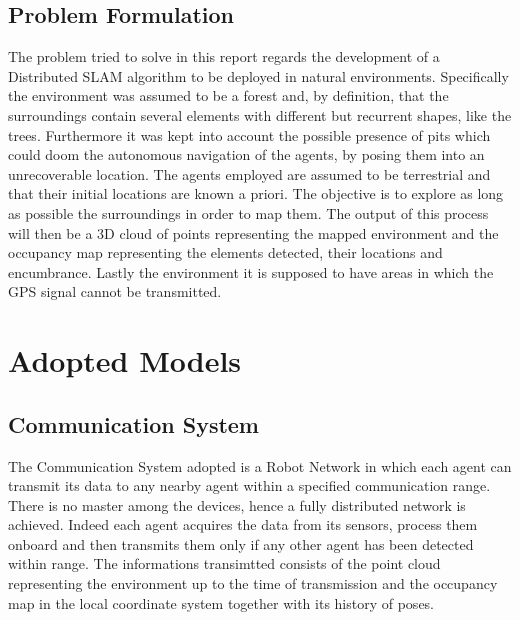 \documentclass[twocolumn, a4paper]{article}
\begin{document}
\subsection{Problem Formulation}
The problem tried to solve in this report regards the development
of a Distributed SLAM algorithm to be deployed in natural environments.
Specifically the environment was assumed to be a forest and, by definition,
that the surroundings contain several elements with different but recurrent
shapes, like the trees. Furthermore it was kept into account the possible
presence of pits which could doom the autonomous navigation of the agents,
by posing them into an unrecoverable location. The agents employed are
assumed to be terrestrial and that their initial locations are known a
priori. The objective is to explore as long as possible the surroundings
in order to map them. The output of this process will then be a 3D cloud of
points representing the mapped environment and the occupancy map representing
the elements detected, their locations and encumbrance.
Lastly the environment it is supposed to have areas in which the GPS signal
cannot be transmitted.

\section{Adopted Models}
\subsection{Communication System}
The Communication System adopted is a Robot Network in which each agent can
transmit its data to any nearby agent within a specified communication range.
There is no master among the devices, hence a fully distributed network is
achieved. Indeed each agent acquires the data from its sensors, process them
onboard and then transmits them only if any other agent has been detected
within range. The informations transimtted consists of the point cloud
representing the environment up to the time of transmission and the
occupancy map in the local coordinate system together with its history of
poses.
\end{document}
